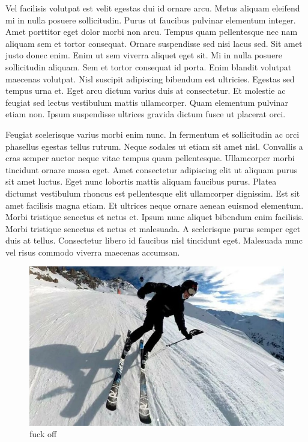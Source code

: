 Vel facilisis volutpat est velit egestas dui id ornare arcu. Metus aliquam eleifend mi in nulla posuere sollicitudin. Purus ut faucibus pulvinar elementum integer. Amet porttitor eget dolor morbi non arcu. Tempus quam pellentesque nec nam aliquam sem et tortor consequat. Ornare suspendisse sed nisi lacus sed. Sit amet justo donec enim. Enim ut sem viverra aliquet eget sit. Mi in nulla posuere sollicitudin aliquam. Sem et tortor consequat id porta. Enim blandit volutpat maecenas volutpat. Nisl suscipit adipiscing bibendum est ultricies. Egestas sed tempus urna et. Eget arcu dictum varius duis at consectetur. Et molestie ac feugiat sed lectus vestibulum mattis ullamcorper. Quam elementum pulvinar etiam non. Ipsum suspendisse ultrices gravida dictum fusce ut placerat orci.

Feugiat scelerisque varius morbi enim nunc. In fermentum et sollicitudin ac orci phasellus egestas tellus rutrum. Neque sodales ut etiam sit amet nisl. Convallis a cras semper auctor neque vitae tempus quam pellentesque. Ullamcorper morbi tincidunt ornare massa eget. Amet consectetur adipiscing elit ut aliquam purus sit amet luctus. Eget nunc lobortis mattis aliquam faucibus purus. Platea dictumst vestibulum rhoncus est pellentesque elit ullamcorper dignissim. Est sit amet facilisis magna etiam. Et ultrices neque ornare aenean euismod elementum. Morbi tristique senectus et netus et. Ipsum nunc aliquet bibendum enim facilisis. Morbi tristique senectus et netus et malesuada. A scelerisque purus semper eget duis at tellus. Consectetur libero id faucibus nisl tincidunt eget. Malesuada nunc vel risus commodo viverra maecenas accumsan.

\begin{figure}[!htbp]
    \center
    \includegraphics[width=\linewidth]{images/placeholder.jpg}
    \caption{fuck off}
\end{figure}


